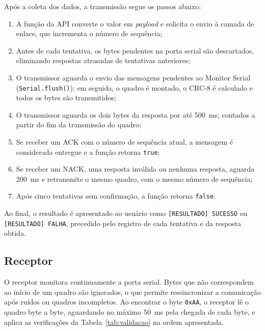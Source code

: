 \documentclass[12pt]{article}
\begin{document}
Após a coleta dos dados, a transmissão segue os passos abaixo:

\begin{enumerate}
  \item A função da API converte o valor em \emph{payload} e solicita o envio à camada de enlace, que incrementa o número de sequência;
  \item Antes de cada tentativa, os bytes pendentes na porta serial são descartados, eliminando respostas atrasadas de tentativas anteriores;
  \item O transmissor aguarda o envio das mensagens pendentes ao Monitor Serial (\texttt{Serial.flush()}); em seguida, o quadro é montado, o CRC-8 é calculado e todos os bytes são transmitidos;
  \item O transmissor aguarda os dois bytes da resposta por até 500~ms, contados a partir do fim da transmissão do quadro;
  \item Se receber um ACK com o número de sequência atual, a mensagem é considerada entregue e a função retorna \texttt{true};
  \item Se receber um NACK, uma resposta inválida ou nenhuma resposta, aguarda 200~ms e retransmite o mesmo quadro, com o mesmo número de sequência;
  \item Após cinco tentativas sem confirmação, a função retorna \texttt{false}.
\end{enumerate}

Ao final, o resultado é apresentado ao usuário como \texttt{[RESULTADO] SUCESSO} ou \texttt{[RESULTADO] FALHA}, precedido pelo registro de cada tentativa e da resposta obtida.

\subsection{Receptor}

O receptor monitora continuamente a porta serial. Bytes que não correspondem ao início de um quadro são ignorados, o que permite ressincronizar a comunicação após ruídos ou quadros incompletos. Ao encontrar o byte \texttt{0xAA}, o receptor lê o quadro byte a byte, aguardando no máximo 50~ms pela chegada de cada byte, e aplica as verificações da Tabela~\ref{tab:validacao} na ordem apresentada.
\end{document}
